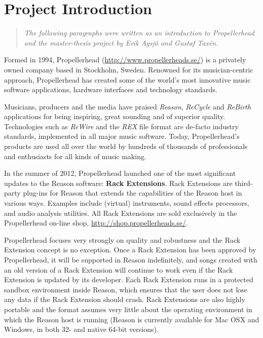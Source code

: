 \chapter* {Project Introduction}

\begin {quote}
    \emph {The following paragraphs were written as an introduction to
           Propellerhead and the master-thesis project by Erik Agsjö and Gustaf
           Taxén.}
\end {quote}

Formed in 1994, Propellerhead (\url {http://www.propellerheads.se/}) is a
privately owned company based in Stockholm, Sweden. Renowned for its
musician-centric approach, Propellerhead has created some of the world's most
innovative music software applications, hardware interfaces and technology
standards.

Musicians, producers and the media have praised \emph {Reason}, \emph {ReCycle}
and \emph {ReBirth} applications for being inspiring, great sounding and of
superior quality. Technologies such as \emph {ReWire} and the \emph {REX} file
format are de-facto industry standards, implemented in all major music software.
Today, Propellerhead’s products are used all over the world by hundreds of
thousands of professionals and enthusiasts for all kinds of music making.

In the summer of 2012, Propellerhead launched one of the most significant
updates to the Reason software: \textbf {Rack Extensions}. Rack Extensions are
third-party plug-ins for Reason that extends the capabilities of the Reason host
in various ways. Examples include (virtual) instruments, sound effects
processors, and audio analysis utilities. All Rack Extensions are sold
exclusively in the Propellerhead on-line shop,
\url {http://shop.propellerheads.se/}.

Propellerhead focuses very strongly on quality and robustness and the Rack
Extension concept is no exception. Once a Rack Extension has been approved by
Propellerhead, it will be supported in Reason indefinitely, and songs created
with an old version of a Rack Extension will continue to work even if the Rack
Extension is updated by its developer. Each Rack Extension runs in a protected
sandbox environment inside Reason, which ensures that the user does not lose any
data if the Rack Extension should crash. Rack Extensions are also highly
portable and the format assumes very little about the operating environment in
which the Reason host is running (Reason is currently available for Mac OSX and
Windows, in both 32- and native 64-bit versions).

